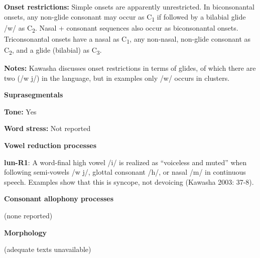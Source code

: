 \begin{styleBody}
\textbf{Onset restrictions: }Simple onsets are apparently unrestricted. In biconsonantal onsets, any non-glide consonant may occur as C\textsubscript{1} if followed by a bilabial glide /w/ as C\textsubscript{2}. Nasal + consonant sequences also occur as biconsonantal onsets. Triconsonantal onsets have a nasal as C\textsubscript{1}, any non-nasal, non-glide consonant as C\textsubscript{2}, and a glide (bilabial) as C\textsubscript{3}.
\end{styleBody}

\begin{styleBody}
\textbf{Notes: }Kawasha discusses onset restrictions in terms of glides, of which there are two (/w j/) in the language, but in examples only /w/ occurs in clusters.
\end{styleBody}

\begin{styleBody}
\textbf{Suprasegmentals}
\end{styleBody}

\begin{styleBody}
\textbf{Tone:} Yes
\end{styleBody}

\begin{styleBody}
\textbf{Word stress: }Not reported
\end{styleBody}

\begin{styleBody}
\textbf{Vowel reduction processes}
\end{styleBody}

\begin{styleBody}
\textbf{lun-R1}: A word-final high vowel /i/ is realized as “voiceless and muted” when following semi-vowels /w j/, glottal consonant /h/, or nasal /m/ in continuous speech. Examples show that this is syncope, not devoicing (Kawasha 2003: 37-8).
\end{styleBody}

\begin{styleBody}
\textbf{Consonant allophony processes}
\end{styleBody}

\begin{styleBody}
(none reported)
\end{styleBody}

\begin{styleBody}
\textbf{Morphology}
\end{styleBody}

\begin{styleBody}
(adequate texts unavailable)
\end{styleBody}

